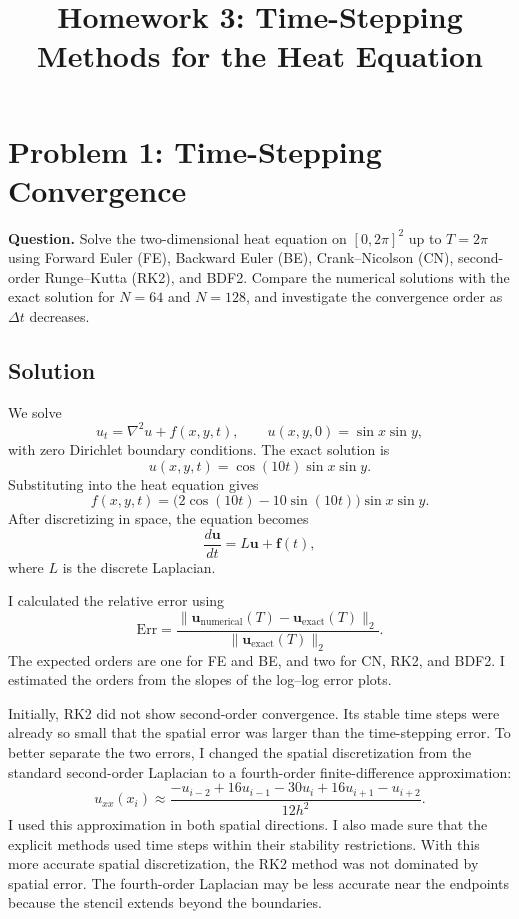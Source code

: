 \documentclass[11pt]{article}
\title{Homework 3: Time-Stepping Methods for the Heat Equation}
\author{}
\date{}
\begin{document}
\maketitle

\section*{Problem 1: Time-Stepping Convergence}
\textbf{Question.} Solve the two-dimensional heat equation on $[0,2\pi]^2$ up to $T=2\pi$ using Forward Euler (FE), Backward Euler (BE), Crank--Nicolson (CN), second-order Runge--Kutta (RK2), and BDF2. Compare the numerical solutions with the exact solution for $N=64$ and $N=128$, and investigate the convergence order as $\Delta t$ decreases.

\subsection*{Solution}
We solve
\[
 u_t=\nabla^2u+f(x,y,t),\qquad
 u(x,y,0)=\sin x\sin y,
\]
with zero Dirichlet boundary conditions. The exact solution is
\[
 u(x,y,t)=\cos(10t)\sin x\sin y.
\]
Substituting into the heat equation gives
\[
 f(x,y,t)=\bigl(2\cos(10t)-10\sin(10t)\bigr)\sin x\sin y.
\]
After discretizing in space, the equation becomes
\[
 \frac{d\mathbf{u}}{dt}=L\mathbf{u}+\mathbf{f}(t),
\]
where $L$ is the discrete Laplacian. 

I calculated the relative error using
\[
 \mathrm{Err}=\frac{\|\mathbf{u}_{\mathrm{numerical}}(T)-\mathbf{u}_{\mathrm{exact}}(T)\|_2}{\|\mathbf{u}_{\mathrm{exact}}(T)\|_2}.
\]
The expected orders are one for FE and BE, and two for CN, RK2, and BDF2. I estimated the orders from the slopes of the log--log error plots.

Initially, RK2 did not show second-order convergence. Its stable time steps were already so small that the spatial error was larger than the time-stepping error. To better separate the two errors, I changed the spatial discretization from the standard second-order Laplacian to a fourth-order finite-difference approximation:
\[
 u_{xx}(x_i)\approx\frac{-u_{i-2}+16u_{i-1}-30u_i+16u_{i+1}-u_{i+2}}{12h^2}.
\]
I used this approximation in both spatial directions. I also made sure that the explicit methods used time steps within their stability restrictions. With this more accurate spatial discretization, the RK2 method was not dominated by spatial error. The fourth-order Laplacian may be less accurate near the endpoints because the stencil extends beyond the boundaries.
\end{document}
